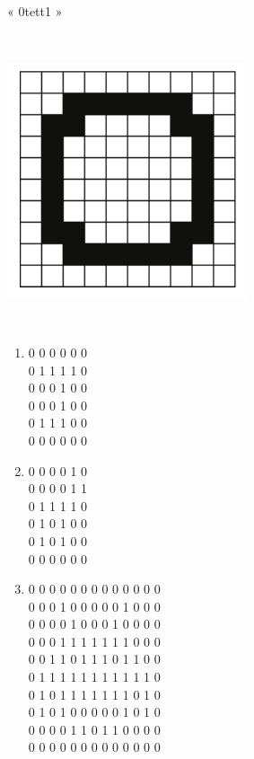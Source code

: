 \begin{Soln}{5}
	~\\
 « 0tett1 »
\end{Soln}
\begin{Soln}{7}
	~\\
	\begin{center}
		\includegraphics[scale=0.5]{images/img_zero.png}
	\end{center}

\end{Soln}
\begin{Soln}{8}
	~\\
	\begin{multicols}{2}
		\begin{enumerate}[label=\alph*)]
			\item  0 0 0 0 0 0\\
				   0 1 1 1 1 0\\
				   0 0 0 1 0 0\\
				   0 0 0 1 0 0\\
				   0 1 1 1 0 0\\
				   0 0 0 0 0 0\\

	        \item  0 0 0 0 1 0\\
	               0 0 0 0 1 1\\
	               0 1 1 1 1 0\\
	               0 1 0 1 0 0\\
	               0 1 0 1 0 0\\
	               0 0 0 0 0 0\\
	        \item  0 0 0 0 0 0 0 0 0 0 0 0 0\\
	               0 0 0 1 0 0 0 0 0 1 0 0 0\\
	               0 0 0 0 1 0 0 0 1 0 0 0 0\\
	               0 0 0 1 1 1 1 1 1 1 0 0 0\\
	               0 0 1 1 0 1 1 1 0 1 1 0 0\\
	               0 1 1 1 1 1 1 1 1 1 1 1 0\\
	               0 1 0 1 1 1 1 1 1 1 0 1 0\\
	               0 1 0 1 0 0 0 0 0 1 0 1 0\\
	               0 0 0 0 1 1 0 1 1 0 0 0 0\\
	               0 0 0 0 0 0 0 0 0 0 0 0 0\\
		\end{enumerate}
		\end{multicols}
\end{Soln}
